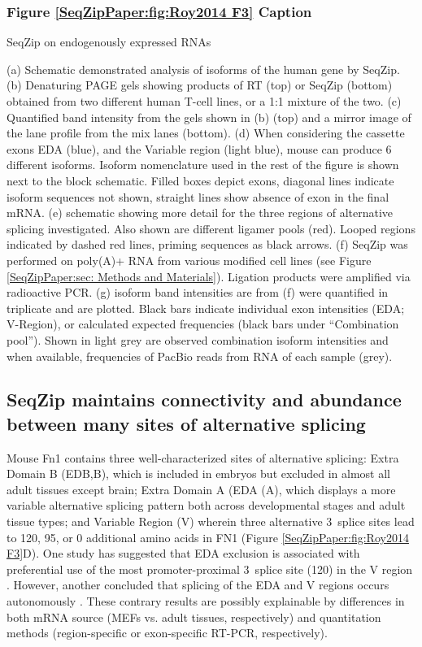 			\subsubsection{Figure \ref{SeqZipPaper:fig:Roy2014 F3} Caption}
				\label{SeqZipPaper:figCap: Roy2014 F3}

				SeqZip on endogenously expressed RNAs

				(a) Schematic demonstrated analysis of isoforms of the human \cd{} gene by SeqZip.
				(b) Denaturing PAGE gels showing products of RT (top) or SeqZip (bottom) \cd{} obtained from two different human T-cell lines, or a 1:1 mixture of the two.
				(c) Quantified band intensity from the gels shown in (b) (top) and a mirror image of the lane profile from the mix lanes (bottom).
				(d) When considering the cassette exons EDA (blue), and the Variable region (light blue), mouse \fn{} can produce 6 different isoforms. Isoform nomenclature used in the rest of the figure is shown next to the block schematic. Filled boxes depict exons, diagonal lines indicate isoform sequences not shown, straight lines show absence of exon in the final mRNA.
				(e) schematic showing more detail for the three regions of \fn{} alternative splicing investigated. Also shown are different ligamer pools (red). Looped regions indicated by dashed red lines, priming sequences as black arrows. 
				 (f) SeqZip was performed on poly(A)+ RNA from various \fn{} modified cell lines (see Figure \ref{SeqZipPaper:sec: Methods and Materials}). Ligation products were amplified via radioactive PCR. 
				(g) isoform band intensities are from (f) were quantified in triplicate and are plotted. Black bars indicate individual exon intensities (EDA; V-Region), or calculated expected frequencies (black bars under ``Combination pool''). Shown in light grey are observed combination isoform intensities and when available, frequencies of PacBio reads from RNA of each sample (grey). 

	\subsection{SeqZip maintains connectivity and abundance between many sites of alternative splicing}
		\label{SeqZipPaper:subsec: SeqZip Maintains Connectivity}

		Mouse Fn1 contains three well-characterized sites of alternative splicing: Extra Domain B (EDB,B), which is included in embryos but excluded in almost all adult tissues except brain; Extra Domain A (EDA (A), which displays a more variable alternative splicing pattern both across developmental stages and adult tissue types; and Variable Region (V) wherein three alternative 3\textprime~splice sites lead to 120, 95, or 0 additional amino acids in FN1 (Figure \ref{SeqZipPaper:fig:Roy2014 F3}D). One study has suggested that EDA exclusion is associated with preferential use of the most promoter-proximal 3\textprime~splice site (120) in the V region \citep{Fededa2005}. However, another concluded that splicing of the EDA and V regions occurs autonomously \citep{Chauhan2004}. These contrary results are possibly explainable by differences in both mRNA source (MEFs vs. adult tissues, respectively) and quantitation methods (region-specific or exon-specific RT-PCR, respectively).

